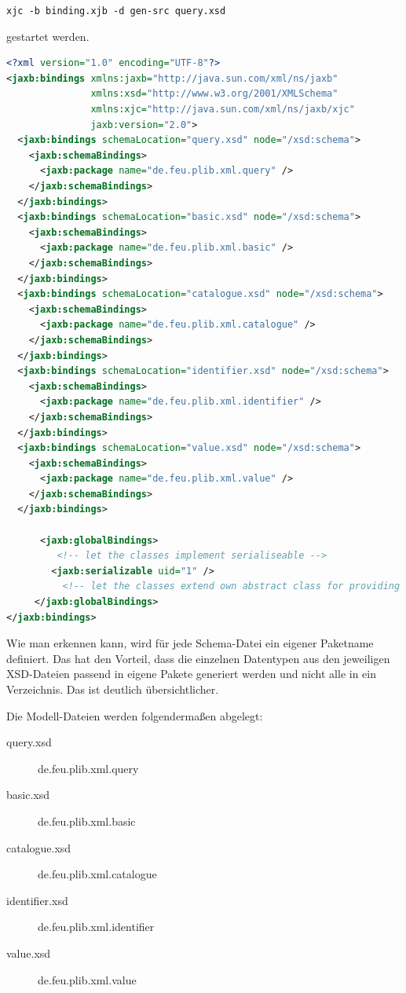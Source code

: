 \lstinline[basicstyle=\ttfamily\small\mdseries]{xjc -b binding.xjb -d gen-src query.xsd}

gestartet werden.  

\begin{lstlisting}[caption=Binding File binding.xjc, language=XML, label=lst:bindingfile]
<?xml version="1.0" encoding="UTF-8"?>
<jaxb:bindings xmlns:jaxb="http://java.sun.com/xml/ns/jaxb"
               xmlns:xsd="http://www.w3.org/2001/XMLSchema"
               xmlns:xjc="http://java.sun.com/xml/ns/jaxb/xjc"
               jaxb:version="2.0">
  <jaxb:bindings schemaLocation="query.xsd" node="/xsd:schema">
    <jaxb:schemaBindings>
      <jaxb:package name="de.feu.plib.xml.query" />
    </jaxb:schemaBindings>
  </jaxb:bindings>
  <jaxb:bindings schemaLocation="basic.xsd" node="/xsd:schema">
    <jaxb:schemaBindings>
      <jaxb:package name="de.feu.plib.xml.basic" />
    </jaxb:schemaBindings>
  </jaxb:bindings>
  <jaxb:bindings schemaLocation="catalogue.xsd" node="/xsd:schema">
    <jaxb:schemaBindings>
      <jaxb:package name="de.feu.plib.xml.catalogue" />
    </jaxb:schemaBindings>
  </jaxb:bindings>
  <jaxb:bindings schemaLocation="identifier.xsd" node="/xsd:schema">
    <jaxb:schemaBindings>
      <jaxb:package name="de.feu.plib.xml.identifier" />
    </jaxb:schemaBindings>
  </jaxb:bindings>
  <jaxb:bindings schemaLocation="value.xsd" node="/xsd:schema">
    <jaxb:schemaBindings>
      <jaxb:package name="de.feu.plib.xml.value" />
    </jaxb:schemaBindings>
  </jaxb:bindings> 
  
      <jaxb:globalBindings>
         <!-- let the classes implement serialiseable -->
        <jaxb:serializable uid="1" />
          <!-- let the classes extend own abstract class for providing some extra functionality for each one -->
     </jaxb:globalBindings>  
</jaxb:bindings> 
\end{lstlisting}

Wie man erkennen kann, wird für jede Schema-Datei ein eigener Paketname definiert. Das hat den Vorteil, dass die einzelnen Datentypen aus den jeweiligen XSD-Dateien passend in eigene Pakete generiert werden und nicht alle in ein Verzeichnis. Das ist deutlich übersichtlicher. 

Die Modell-Dateien werden folgendermaßen abgelegt:

\begin{description}
\item[query.xsd] de.feu.plib.xml.query
\item[basic.xsd] de.feu.plib.xml.basic
\item[catalogue.xsd] de.feu.plib.xml.catalogue
\item[identifier.xsd] de.feu.plib.xml.identifier
\item[value.xsd] de.feu.plib.xml.value
\end{description}

